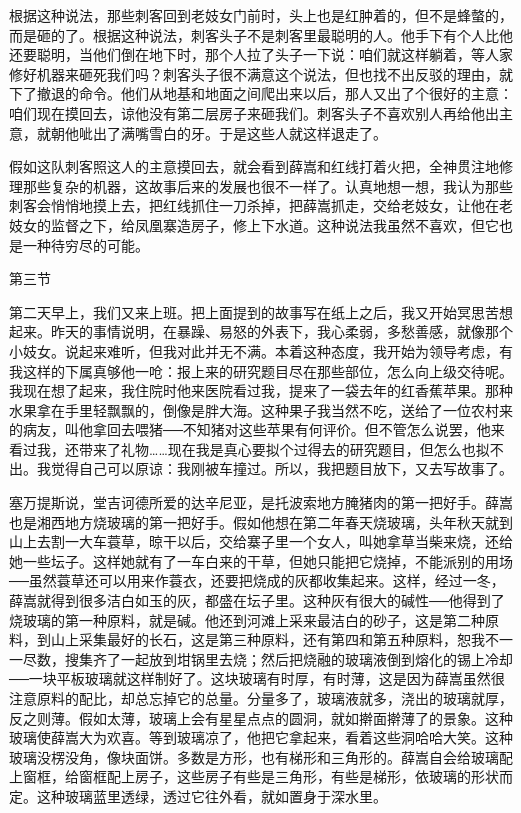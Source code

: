 根据这种说法，那些刺客回到老妓女门前时，头上也是红肿着的，但不是蜂螫的，而是砸的了。根据这种说法，刺客头子不是刺客里最聪明的人。他手下有个人比他还要聪明，当他们倒在地下时，那个人拉了头子一下说：咱们就这样躺着，等人家修好机器来砸死我们吗？刺客头子很不满意这个说法，但也找不出反驳的理由，就下了撤退的命令。他们从地基和地面之间爬出来以后，那人又出了个很好的主意：咱们现在摸回去，谅他没有第二层房子来砸我们。刺客头子不喜欢别人再给他出主意，就朝他呲出了满嘴雪白的牙。于是这些人就这样退走了。 

假如这队刺客照这人的主意摸回去，就会看到薛嵩和红线打着火把，全神贯注地修理那些复杂的机器，这故事后来的发展也很不一样了。认真地想一想，我认为那些刺客会悄悄地摸上去，把红线抓住一刀杀掉，把薛嵩抓走，交给老妓女，让他在老妓女的监督之下，给凤凰寨造房子，修上下水道。这种说法我虽然不喜欢，但它也是一种待穷尽的可能。 

第三节 

第二天早上，我们又来上班。把上面提到的故事写在纸上之后，我又开始冥思苦想起来。昨天的事情说明，在暴躁、易怒的外表下，我心柔弱，多愁善感，就像那个小妓女。说起来难听，但我对此并无不满。本着这种态度，我开始为领导考虑，有我这样的下属真够他一呛：报上来的研究题目尽在那些部位，怎么向上级交待呢。我现在想了起来，我住院时他来医院看过我，提来了一袋去年的红香蕉苹果。那种水果拿在手里轻飘飘的，倒像是胖大海。这种果子我当然不吃，送给了一位农村来的病友，叫他拿回去喂猪──不知猪对这些苹果有何评价。但不管怎么说罢，他来看过我，还带来了礼物……现在我是真心要拟个过得去的研究题目，但怎么也拟不出。我觉得自己可以原谅：我刚被车撞过。所以，我把题目放下，又去写故事了。 

塞万提斯说，堂吉诃德所爱的达辛尼亚，是托波索地方腌猪肉的第一把好手。薛嵩也是湘西地方烧玻璃的第一把好手。假如他想在第二年春天烧玻璃，头年秋天就到山上去割一大车蓑草，晾干以后，交给寨子里一个女人，叫她拿草当柴来烧，还给她一些坛子。这样她就有了一车白来的干草，但她只能把它烧掉，不能派别的用场──虽然蓑草还可以用来作蓑衣，还要把烧成的灰都收集起来。这样，经过一冬，薛嵩就得到很多洁白如玉的灰，都盛在坛子里。这种灰有很大的碱性──他得到了烧玻璃的第一种原料，就是碱。他还到河滩上采来最洁白的砂子，这是第二种原料，到山上采集最好的长石，这是第三种原料，还有第四和第五种原料，恕我不一一尽数，搜集齐了一起放到坩锅里去烧；然后把烧融的玻璃液倒到熔化的锡上冷却──一块平板玻璃就这样制好了。这块玻璃有时厚，有时薄，这是因为薛嵩虽然很注意原料的配比，却总忘掉它的总量。分量多了，玻璃液就多，浇出的玻璃就厚，反之则薄。假如太薄，玻璃上会有星星点点的圆洞，就如擀面擀薄了的景象。这种玻璃使薛嵩大为欢喜。等到玻璃凉了，他把它拿起来，看着这些洞哈哈大笑。这种玻璃没楞没角，像块面饼。多数是方形，也有梯形和三角形的。薛嵩自会给玻璃配上窗框，给窗框配上房子，这些房子有些是三角形，有些是梯形，依玻璃的形状而定。这种玻璃蓝里透绿，透过它往外看，就如置身于深水里。 

